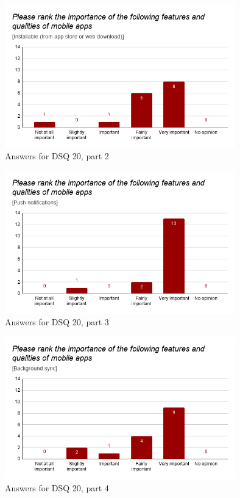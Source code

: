 \documentclass[a4paper,12pt]{article}
\begin{document}
\begin{figure}[ht!]
    \centering
    \includegraphics[width=10cm]{img/Results/dsq20_2.png}
    \caption{Answers for DSQ 20, part 2}
    \label{fig:res_devq20_2}
\end{figure}

\begin{figure}[ht!]
    \centering
    \includegraphics[width=10cm]{img/Results/dsq20_3.png}
    \caption{Answers for DSQ 20, part 3}
    \label{fig:res_devq20_3}
\end{figure}
\newpage

\begin{figure}[ht!]
    \centering
    \includegraphics[width=10cm]{img/Results/dsq20_4.png}
    \caption{Answers for DSQ 20, part 4}
    \label{fig:res_devq20_4}
\end{figure}
\end{document}
